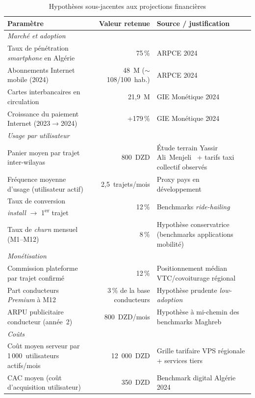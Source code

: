 \documentclass[12pt, a4paper, oneside]{report}
\begin{document}
\begin{table}[H]
\centering
\footnotesize
\begin{tabularx}{\textwidth}{|l|r|X|}
\hline
\rowcolor{rohlight}
\textbf{Paramètre} & \textbf{Valeur retenue} & \textbf{Source / justification} \\
\hline
\multicolumn{3}{|l|}{\cellcolor{rohlight!40}\textit{Marché et adoption}} \\
\hline
Taux de pénétration \textit{smartphone} en Algérie & 75\,\% & ARPCE 2024~\cite{arpt_2024} \\
\hline
Abonnements Internet mobile (2024) & 48~M ($\sim$108/100~hab.) & ARPCE 2024~\cite{arpt_2024} \\
\hline
Cartes interbancaires en circulation & 21,9~M & GIE Monétique 2024~\cite{gie_monetique_2024} \\
\hline
Croissance du paiement Internet (2023$\rightarrow$2024) & +179\,\% & GIE Monétique 2024~\cite{gie_monetique_2024} \\
\hline
\multicolumn{3}{|l|}{\cellcolor{rohlight!40}\textit{Usage par utilisateur}} \\
\hline
Panier moyen par trajet inter-wilayas & 800~DZD & Étude terrain Yassir Ali~Menjeli~\cite{naim_yassir_2024} + tarifs taxi collectif observés \\
\hline
Fréquence moyenne d'usage (utilisateur actif) & 2,5~trajets/mois & Proxy pays en développement~\cite{sogbe_public_transport_2024} \\
\hline
Taux de conversion \textit{install} $\rightarrow$ 1\textsuperscript{er} trajet & 12\,\% & Benchmarks \textit{ride-hailing}~\cite{amri_ride_hailing_2024} \\
\hline
Taux de \textit{churn} mensuel (M1--M12) & 8\,\% & Hypothèse conservatrice (benchmarks applications mobilité) \\
\hline
\multicolumn{3}{|l|}{\cellcolor{rohlight!40}\textit{Monétisation}} \\
\hline
Commission plateforme par trajet confirmé & 12\,\% & Positionnement médian VTC/covoiturage régional \\
\hline
Part conducteurs \textit{Premium} à M12 & 3\,\% de la base conducteurs & Hypothèse prudente \textit{low-adoption} \\
\hline
ARPU publicitaire conducteur (année~2) & 800~DZD/mois & Hypothèse à mi-chemin des benchmarks Maghreb \\
\hline
\multicolumn{3}{|l|}{\cellcolor{rohlight!40}\textit{Coûts}} \\
\hline
Coût moyen serveur par 1\,000~utilisateurs actifs/mois & 12~000~DZD & Grille tarifaire VPS régionale + services tiers \\
\hline
CAC moyen (coût d'acquisition utilisateur) & 350~DZD & Benchmark digital Algérie 2024 \\
\hline
\end{tabularx}
  \caption{Hypothèses sous-jacentes aux projections financières}
  \label{tab:hypotheses}
\end{table}
\end{document}
